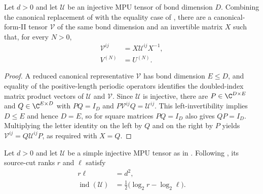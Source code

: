 \begin{lemma}
    \label{thm:mpu_injective_cfii_representative}
    \leanok
    Let $d>0$ and let $\mathcal U$ be an injective MPU tensor of bond
    dimension $D$. Combining the canonical replacement of
    \cite[lines~319--356]{Cirac2017MPU} with the equality case of
    \cite[Proposition~20]{Molnar2018SemiInjective}, there are a
    canonical-form-II tensor $\mathcal V$ of the same bond dimension and an
    invertible matrix $X$ such that, for every $N>0$,
    \begin{align}
        \mathcal V^{ij} & =X\mathcal U^{ij}X^{-1}, \\
        V^{(N)}         & =U^{(N)}.
    \end{align}
\end{lemma}

\begin{proof}\leanok
    A reduced canonical representative $\mathcal V$ has bond dimension
    $E\leq D$, and equality of the positive-length periodic operators
    identifies the doubled-index matrix product vectors of $\mathcal U$ and
    $\mathcal V$. Since $\mathcal U$ is injective, there are
    $P\in\C^{D\times E}$ and $Q\in\C^{E\times D}$ with $PQ=I_D$ and
    $P\mathcal V^{ij}Q=\mathcal U^{ij}$. This left-invertibility implies
    $D\leq E$ and hence $D=E$, so for square matrices $PQ=I_D$ also gives
    $QP=I_D$. Multiplying the letter identity on the left by $Q$ and on the
    right by $P$ yields $\mathcal V^{ij}=Q\mathcal U^{ij}P$, as required
    with $X=Q$.
\end{proof}

\begin{lemma}
    \label{thm:mpu_simple_injective_source_index}
    \leanok
    Let $d>0$ and let $\mathcal U$ be a simple injective MPU tensor as in
    \cite[lines~1403--1407]{FrancoRubio2025MPUGauging}. Following
    \cite[lines~562--573 and~681--704]{Cirac2017MPU}, its source-cut ranks
    $r$ and $\ell$ satisfy
    \begin{align}
        r\ell & =d^2,                                    \\
        \operatorname{ind}(\mathcal U)
              & =\frac12\bigl(\log_2 r-\log_2\ell\bigr).
    \end{align}
\end{lemma}

